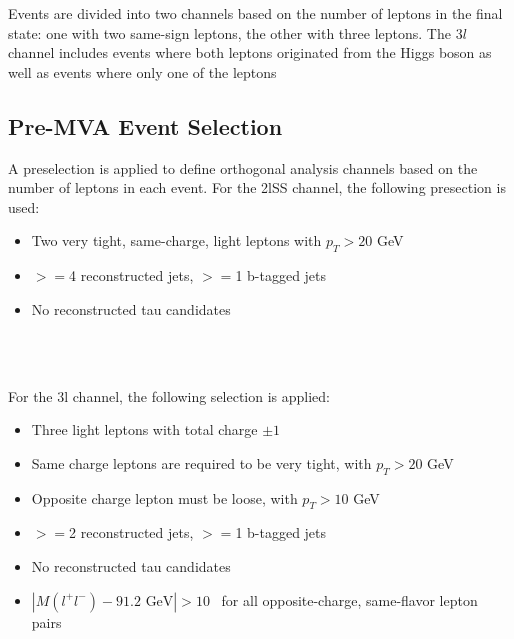 Events are divided into two channels based on the number of leptons in the final state: one with two same-sign leptons, the other with three leptons. The $3l$ channel includes events where both leptons originated from the Higgs boson as well as events where only one of the leptons 


\subsection{Pre-MVA Event Selection}
\label{subsec:preMVA}

A preselection is applied to define orthogonal analysis channels based on the number of leptons in each event. For the 2lSS channel, the following presection is used:

\begin{itemize}
  \item Two very tight, same-charge, light leptons with $p_T > 20$ GeV
  \item $>=$4 reconstructed jets, $>=$1 b-tagged jets
  \item No reconstructed tau candidates
\end{itemize}

\begin{figure}[H]
    \\
    \\
    \caption{}                           
    \label{fig:presel2lSS}
\end{figure}

For the 3l channel, the following selection is applied:

\begin{itemize}
  \item Three light leptons with total charge $\pm 1$
  \item Same charge leptons are required to be very tight, with $p_T > 20$ GeV
  \item Opposite charge lepton must be loose, with $p_T > 10$ GeV
  \item $>=$2 reconstructed jets, $>=$1 b-tagged jets                                                                        
  \item No reconstructed tau candidates
  \item $|M(l^+l^-)-91.2\textrm{ GeV}| > 10$~\GeV{} for all opposite-charge, same-flavor lepton pairs
\end{itemize}

